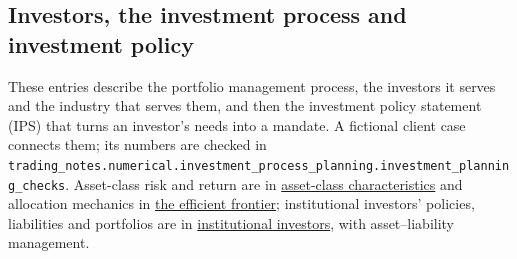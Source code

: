 \subsection{Investors, the investment process and investment policy}

These entries describe the portfolio management process, the investors it serves and the industry that serves them, and then the investment policy statement (IPS) that turns an investor's needs into a mandate. A fictional client case connects them; its numbers are checked in \nolinkurl{trading_notes.numerical.investment_process_planning.investment_planning_checks}. Asset-class risk and return are in \hyperref[def:asset-class-characteristics]{asset-class characteristics} and allocation mechanics in \hyperref[meth:efficient-frontier]{the efficient frontier}; institutional investors' policies, liabilities and portfolios are in \hyperref[def:institutional-investor-characteristics]{institutional investors}, with asset--liability management.


